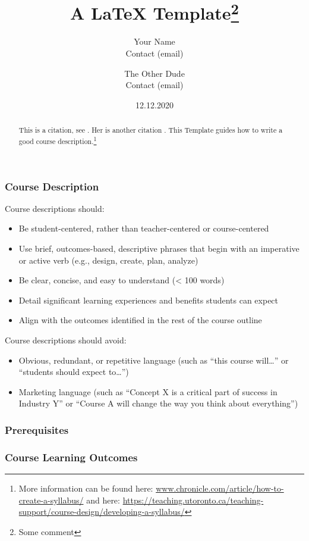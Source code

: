 \documentclass{article}
\title{A \LaTeX{} Template\thanks{Some comment}}
\author{Your Name  \\
	Contact (email) \\
	\and 
	The Other Dude \\
	Contact (email) \\
}
\date{12.12.2020}
\begin{document}
	\maketitle
	
\begin{abstract}
	This is a citation, see \cite{Huber2020}. Her is another citation \cite{Eck2016}. This Template guides how to write a good course description.\footnote{More information can be found here: \url{www.chronicle.com/article/how-to-create-a-syllabus/} and here: \url{https://teaching.utoronto.ca/teaching-support/course-design/developing-a-syllabus/}}
\end{abstract}
	
\subsubsection*{Course Description}
	Course descriptions should:\label{book}
\begin{itemize}
	\item Be student-centered, rather than teacher-centered or course-centered
	\item Use brief, outcomes-based, descriptive phrases that begin with an imperative or active verb (e.g., design, create, plan, analyze)
	\item Be clear, concise, and easy to understand (< 100 words)
	\item Detail significant learning experiences and benefits students can expect
	\item Align with the outcomes identified in the rest of the course outline
\end{itemize}	
	Course descriptions should avoid:
\begin{itemize}
	\item Obvious, redundant, or repetitive language (such as “this course will…” or “students should expect to…”)
	\item Marketing language (such as ``Concept X is a critical part of success in Industry Y'' or ``Course A will change the way you think about everything'')
\end{itemize}
	
\subsubsection*{Prerequisites}

\subsubsection*{Course Learning Outcomes}
\end{document}
